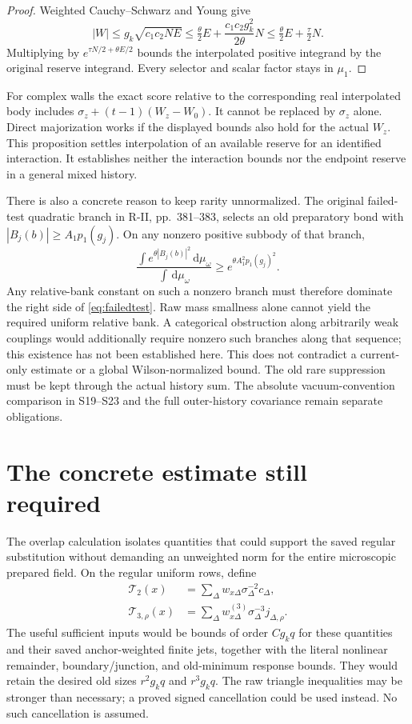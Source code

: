 \documentclass[11pt,letterpaper]{article}
\theoremstyle{plain}
\theoremstyle{remark}\newtheorem{remark}[theorem]{Scope}
\newcommand{\dd}{\,\mathrm d}\newcommand{\eps}{\varepsilon}
\begin{document}
\begin{proof}
Weighted Cauchy--Schwarz and Young give
\[
 |W|\le g_k\sqrt{c_1c_2NE}
 \le\tfrac\theta2E+\frac{c_1c_2g_k^2}{2\theta}N
 \le\tfrac\theta2E+\tfrac\tau2N.
\]
Multiplying by $e^{\tau N/2+\theta E/2}$ bounds the interpolated positive
integrand by the original reserve integrand. Every selector and scalar
factor stays in $\mu_1$.
\end{proof}

For complex walls the exact score relative to the corresponding real
interpolated body includes
$\sigma_z+(t-1)(W_z-W_0)$. It cannot be replaced by $\sigma_z$ alone.
Direct majorization works if the displayed bounds also hold for the actual
$W_z$. This proposition settles interpolation of an available reserve for
an identified interaction. It establishes neither the interaction bounds
nor the endpoint reserve in a general mixed history.

There is also a concrete reason to keep rarity unnormalized. The original
failed-test quadratic branch in R-II, pp.\ 381--383, selects an old
preparatory bond with $|B_j(b)|\ge A_1p_1(g_j)$. On any nonzero positive
subbody of that branch,
\begin{equation}
 \frac{\int e^{\theta|B_j(b)|^2}\dd\mu_\omega}
      {\int\dd\mu_\omega}
 \ge e^{\theta A_1^2p_1(g_j)^2}.
 \label{eq:failedtest}
\end{equation}
Any relative-bank constant on such a nonzero branch must therefore dominate
the right side of \eqref{eq:failedtest}. Raw mass smallness alone cannot
yield the required uniform relative bank. A categorical obstruction along
arbitrarily weak couplings would additionally require nonzero such branches
along that sequence; this existence has not been established here.
This does not contradict a current-only estimate or a global Wilson-normalized
bound. The old rare suppression must be kept through the actual history sum. The absolute
vacuum-convention comparison in S19--S23 and the full outer-history
covariance remain separate obligations.

\section{The concrete estimate still required}

The overlap calculation isolates quantities that could support the saved
regular substitution without demanding an unweighted norm for the entire
microscopic prepared field. On the regular uniform rows, define
\begin{align}
 \mathcal T_2(x)&=
   \sum_\Delta w_{x\Delta}\sigma_\Delta^{-2}c_\Delta,\\
 \mathcal T_{3,\rho}(x)&=
   \sum_\Delta w^{(3)}_{x\Delta}\sigma_\Delta^{-3}j_{\Delta,\rho}.
 \label{eq:targets}
\end{align}
The useful sufficient inputs would be bounds of order $Cg_kq$ for these
quantities and their saved anchor-weighted finite jets, together with the
literal nonlinear remainder, boundary/junction, and old-minimum response
bounds. They would retain the desired old sizes $r^2g_kq$ and $r^3g_kq$.
The raw triangle inequalities may be stronger than necessary; a proved
signed cancellation could be used instead. No such cancellation is assumed.
\end{document}
